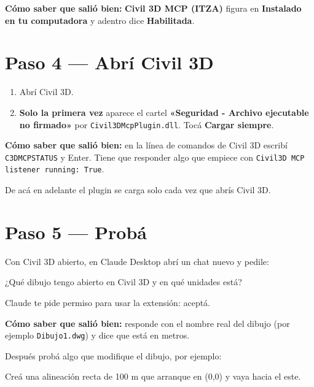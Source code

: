 \documentclass[12pt, a4paper]{article}
\newcommand{\nota}[1]{%
  \par\noindent\colorbox{fondoNota}{\parbox{\dimexpr\linewidth-2\fboxsep\relax}{\setlength{\parindent}{0pt}#1}}\par}
\begin{document}
\textbf{Cómo saber que salió bien:} \textbf{Civil 3D MCP (ITZA)} figura en
\textbf{Instalado en tu computadora} y adentro dice \textbf{Habilitada}.

\section*{Paso 4 --- Abrí Civil 3D}

\begin{enumerate}
  \item Abrí Civil 3D.
  \item \textbf{Solo la primera vez} aparece el cartel \textbf{«Seguridad - Archivo ejecutable
  no firmado»} por \texttt{Civil3DMcpPlugin.dll}. Tocá \textbf{Cargar siempre}.
\end{enumerate}

\textbf{Cómo saber que salió bien:} en la línea de comandos de Civil 3D escribí
\texttt{C3DMCPSTATUS} y Enter. Tiene que responder algo que empiece con
\texttt{Civil3D MCP listener running: True}.

De acá en adelante el plugin se carga solo cada vez que abrís Civil 3D.

\section*{Paso 5 --- Probá}

Con Civil 3D abierto, en Claude Desktop abrí un chat nuevo y pedile:

\nota{¿Qué dibujo tengo abierto en Civil 3D y en qué unidades está?}

Claude te pide permiso para usar la extensión: aceptá.

\textbf{Cómo saber que salió bien:} responde con el nombre real del dibujo (por ejemplo
\texttt{Dibujo1.dwg}) y dice que está en metros.

Después probá algo que modifique el dibujo, por ejemplo:

\nota{Creá una alineación recta de 100 m que arranque en (0,0) y vaya hacia el este.}
\end{document}
